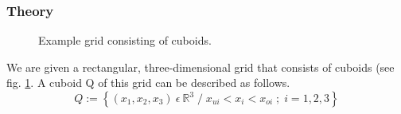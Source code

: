   \subsubsection{Theory}
    \begin{figure}[h]
      \centering {}
      \caption{Example grid consisting of cuboids.}
      \label{fig:grid of cuboids}
    \end{figure}
    We are given a rectangular, three-dimensional grid that consists of cuboids (see fig. \ref{fig:grid of cuboids}. A cuboid Q of this grid can be described as follows.
    \begin{equation}
	    Q := \left\lbrace \left( x_{1},x_{2},x_{3} \right) ~ \epsilon ~  \mathbb{R}^{3} \;  / \;  x_{ui} < x_{i} < x_{oi} \;  ; \;  i=1,2,3  \right\rbrace 
    \end{equation}
